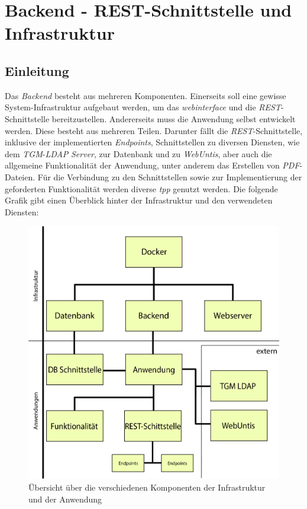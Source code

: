 
\section{Backend - REST-Schnittstelle und Infrastruktur}
\label{chap:backendsota}
	\subsection{Einleitung}
	Das \textit{Backend} besteht aus mehreren Komponenten. Einerseits soll eine gewisse System-Infrastruktur aufgebaut werden, um das \textit{\gls{webinterface}} und die \textit{REST}-Schnittstelle bereitzustellen. Andererseits muss die Anwendung selbst entwickelt werden. Diese besteht aus mehreren Teilen. Darunter fällt die \textit{REST}-Schnittstelle, inklusive der implementierten \textit{Endpoints}, Schnittstellen zu diversen Diensten, wie dem \textit{TGM}-\textit{LDAP} \textit{Server}, zur Datenbank und zu \textit{WebUntis}, aber auch die allgemeine Funktionalität der Anwendung, unter anderem das Erstellen von \textit{PDF}-Dateien. Für die Verbindung zu den Schnittstellen sowie zur Implementierung der geforderten Funktionalität werden diverse  \textit{\gls{tpp}} genutzt werden. Die folgende Grafik gibt einen Überblick hinter der Infrastruktur und den verwendeten Diensten:
	\begin{figure}[H]
		\centering
		\includegraphics[width=0.8\linewidth]{images/uebersicht}
		\caption[Übersicht über die Komponenten]{Übersicht über die verschiedenen Komponenten der Infrastruktur und der Anwendung}
		\label{fig:uebersicht}
	\end{figure}
	
